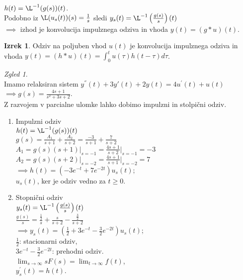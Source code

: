 \documentclass[a4paper, 12pt]{book}
\theoremstyle{definition}
\newtheorem{theorem}[counter]{Izrek}
\theoremstyle{remark}
\newtheorem*{exmp}{Zgled}
\begin{document}
$h(t) = \L^{-1}(g(s))(t)$. \\
Podobno iz $\L(u_s(t))(s) = \frac{1}{s}$ sledi $y_s(t) =
\L^{-1}\left(\frac{g(s)}{s}\right)(t)$ \\
$\implies$ izhod je konvolucija impulznega odziva in vhoda $y(t) = (g * u)(t)$.
\begin{theorem}
    Odziv na poljuben vhod $u(t)$ je konvolucija impulznega odziva in vhoda
    $y(t) = (h * u)(t) = \int_0^t u(\tau) h(t-\tau) d\tau$.
\end{theorem}
\begin{exmp} \text{} \\
    Imamo relaksiran sistem $y^{''}(t) + 3 y{'}(t) + 2 y(t) = 4 u^{'}(t) + u(t)$ \\
    $\implies g(s) = \frac{4s+1}{s^2+3s+2}$. \\
    Z razvojem v parcialne ulomke lahko dobimo impulzni in stolpični odziv.
    \begin{enumerate}[label=\alph*)]
        \item Impulzni odziv \\
            $h(t) = \L^{-1}(g(s))(t)$ \\
            $g(s) = \frac{A_1}{s+1} + \frac{A_2}{s+2} = \frac{-3}{s+1} + \frac{7}{s+2}$ \\
            $A_1 = g(s) (s+1) \vert_{s=-1} = \frac{4s+1}{s+2} \vert_{s=-1} = -3$ \\
            $A_2 = g(s) (s+2) \vert_{s=-2} = \frac{4s+1}{s+1} \vert_{s=-2} = 7$ \\
            $\implies h(t) = \left( -3e^{-t} + 7e^{-2t}\right) u_s(t)$; \\
            $u_s(t)$, ker je odziv vedno za $t \geq 0$.
        \item Stopnični odziv \\
            $y_s(t) = \L^{-1}\left(\frac{g(s)}{s}\right)(t)$ \\
            $\frac{g(s)}{s} = \frac{\frac{1}{2}}{s} + \frac{s}{s+2} - \frac{\frac{3}{2}}{s+2}$ \\
            $\implies y_s(t) = \left(\frac{1}{2} + 3 e^{-t} - \frac{3}{2} e^{-2t}\right) u_s(t)$; \\
            $\frac{1}{2}$: stacionarni odziv, \\
            $3e^{-t} - \frac{3}{2} e^{-2t}$: prehodni odziv. \\
            $\lim_{s \to \infty} s F(s) = \lim_{t \to \infty} f(t)$, \\
            $y_s^{'}(t) = h(t)$.
    \end{enumerate}
\end{exmp}




%
%



\end{document}
